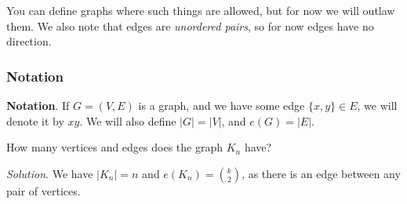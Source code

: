\documentclass[11pt, mathserif]{beamer}
\theoremstyle{definition}
\theoremstyle{remark}
\begin{document}
\begin{frame}
\begin{center}
  
    \end{center}
    
    You can define graphs where such things are allowed, but for now we will outlaw them. We also note that edges are \emph{unordered pairs}, so for now edges have no direction.
  

\end{frame}

\begin{frame}
  \frametitle{Notation}

  \textbf{Notation}. If $G=(V, E)$ is a graph, and we have some edge $\{x, y\} \in E$, we will denote it by $x y$. We will also define $|G|=|V|$, and $e(G)=|E|$.

  \vspace*{1.25cm}

  \begin{example}
    How many vertices and edges does the graph $K_n$ have?



    
  \end{example}

  \pause

  \emph{Solution}. We have $|K_n| = n$ and $e(K_n) = \binom{k}{2}$, as there is an edge between any pair of vertices.

\end{frame}
\end{document}
